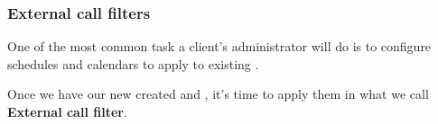 \documentclass[letterpaper,10pt,english]{sphinxmanual}
\begin{document}
\subsubsection{External call filters}
\label{administration_portal/client/vpbx/routing_tools/external_call_filters:external-call-filters}\label{administration_portal/client/vpbx/routing_tools/external_call_filters:external-filters}\label{administration_portal/client/vpbx/routing_tools/external_call_filters::doc}
One of the most common task a client's administrator will do is to
configure schedules and calendars to apply to existing {\hyperref[administration_portal/client/vpbx/ddis:ddis]{}}.

Once we have our new created {\hyperref[administration_portal/client/vpbx/routing_tools/schedules:schedules]{}} and {\hyperref[administration_portal/client/vpbx/routing_tools/calendars:calendars]{}}, it's time to apply them
in what we call \textbf{External call filter}.
\end{document}
